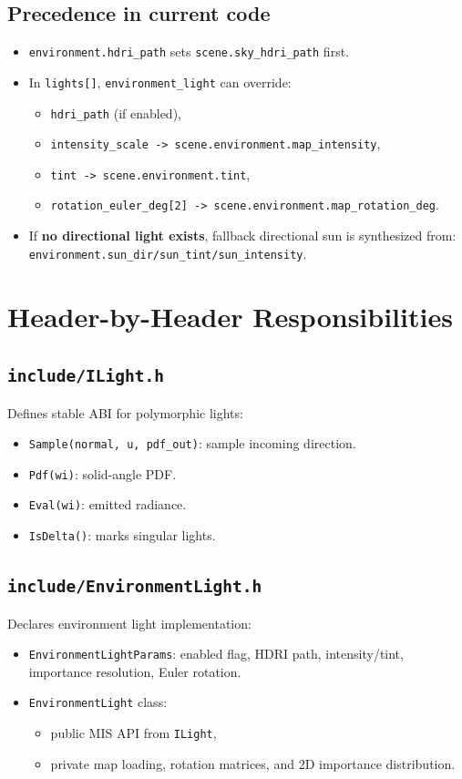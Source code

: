 \documentclass[11pt]{article}
\begin{document}
\subsection{Precedence in current code}
\begin{itemize}[leftmargin=1.5em]
  \item \verb|environment.hdri_path| sets \verb|scene.sky_hdri_path| first.
  \item In \verb|lights[]|, \verb|environment_light| can override:
  \begin{itemize}
    \item \verb|hdri_path| (if enabled),
    \item \verb|intensity_scale -> scene.environment.map_intensity|,
    \item \verb|tint -> scene.environment.tint|,
    \item \verb|rotation_euler_deg[2] -> scene.environment.map_rotation_deg|.
  \end{itemize}
  \item If \textbf{no directional light exists}, fallback directional sun is synthesized from:
  \verb|environment.sun_dir/sun_tint/sun_intensity|.
\end{itemize}

\section{Header-by-Header Responsibilities}
\subsection{\texttt{include/ILight.h}}
Defines stable ABI for polymorphic lights:
\begin{itemize}[leftmargin=1.5em]
  \item \verb|Sample(normal, u, pdf_out)|: sample incoming direction.
  \item \verb|Pdf(wi)|: solid-angle PDF.
  \item \verb|Eval(wi)|: emitted radiance.
  \item \verb|IsDelta()|: marks singular lights.
\end{itemize}

\subsection{\texttt{include/EnvironmentLight.h}}
Declares environment light implementation:
\begin{itemize}[leftmargin=1.5em]
  \item \verb|EnvironmentLightParams|: enabled flag, HDRI path, intensity/tint, importance resolution, Euler rotation.
  \item \verb|EnvironmentLight| class:
  \begin{itemize}
    \item public MIS API from \verb|ILight|,
    \item private map loading, rotation matrices, and 2D importance distribution.
  \end{itemize}
\end{itemize}
\end{document}
